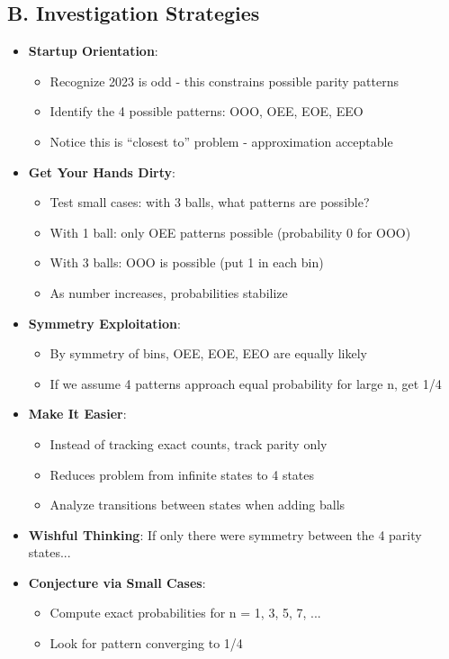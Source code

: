 \documentclass[12pt]{article}
\begin{document}
\begin{strategicbox}
\subsection*{B. Investigation Strategies}
\begin{itemize}[leftmargin=*]
    \item \textbf{Startup Orientation}: 
    \begin{itemize}
        \item Recognize 2023 is odd - this constrains possible parity patterns
        \item Identify the 4 possible patterns: OOO, OEE, EOE, EEO
        \item Notice this is ``closest to'' problem - approximation acceptable
    \end{itemize}
    \item \textbf{Get Your Hands Dirty}: 
    \begin{itemize}
        \item Test small cases: with 3 balls, what patterns are possible?
        \item With 1 ball: only OEE patterns possible (probability 0 for OOO)
        \item With 3 balls: OOO is possible (put 1 in each bin)
        \item As number increases, probabilities stabilize
    \end{itemize}
    \item \textbf{Symmetry Exploitation}: 
    \begin{itemize}
        \item By symmetry of bins, OEE, EOE, EEO are equally likely
        \item If we assume 4 patterns approach equal probability for large n, get 1/4
    \end{itemize}
    \item \textbf{Make It Easier}: 
    \begin{itemize}
        \item Instead of tracking exact counts, track parity only
        \item Reduces problem from infinite states to 4 states
        \item Analyze transitions between states when adding balls
    \end{itemize}
    \item \textbf{Wishful Thinking}: If only there were symmetry between the 4 parity states...
    \item \textbf{Conjecture via Small Cases}: 
    \begin{itemize}
        \item Compute exact probabilities for n = 1, 3, 5, 7, ...
        \item Look for pattern converging to 1/4
    \end{itemize}
\end{itemize}


\end{strategicbox}
\end{document}
